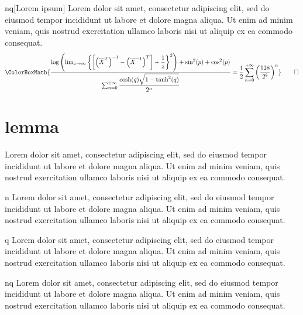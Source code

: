 \begin{proposition}{nq}[Lorem ipsum]
	Lorem dolor sit amet, consectetur adipiscing elit, sed do eiusmod tempor incididunt ut labore et dolore magna aliqua. Ut enim ad minim veniam, quis nostrud exercitation ullamco laboris nisi ut aliquip ex ea commodo consequat.
	\begin{equation*}
		\ColorBoxMath{\dfrac{\log\left(\lim_{z\to\infty}\left\{\left[\left(\overline{X}^{T}\right)^{-1}-\left(\overline{X}^{-1}\right)^T\right]+\dfrac{1}{z}\right\}^2\right)+\sin^2(p)+\cos^2(p)}{\sum_{n=0}^{+\infty}\dfrac{\cosh(q)\sqrt{1-\tanh^2(q)}}{2^n}}=\dfrac{1}{2}\sum_{n=0}^{+\infty}\left(\dfrac{128}{2^8}\right)^n}\qedhere
	\end{equation*}
\end{proposition}

\newpage

\section{lemma}

\begin{lemma}{}
	Lorem dolor sit amet, consectetur adipiscing elit, sed do eiusmod tempor incididunt ut labore et dolore magna aliqua. Ut enim ad minim veniam, quis nostrud exercitation ullamco laboris nisi ut aliquip ex ea commodo consequat.
\end{lemma}

\begin{lemma}{n}
	Lorem dolor sit amet, consectetur adipiscing elit, sed do eiusmod tempor incididunt ut labore et dolore magna aliqua. Ut enim ad minim veniam, quis nostrud exercitation ullamco laboris nisi ut aliquip ex ea commodo consequat.
\end{lemma}

\begin{lemma}{q}
	Lorem dolor sit amet, consectetur adipiscing elit, sed do eiusmod tempor incididunt ut labore et dolore magna aliqua. Ut enim ad minim veniam, quis nostrud exercitation ullamco laboris nisi ut aliquip ex ea commodo consequat.
\end{lemma}

\begin{lemma}{nq}
	Lorem dolor sit amet, consectetur adipiscing elit, sed do eiusmod tempor incididunt ut labore et dolore magna aliqua. Ut enim ad minim veniam, quis nostrud exercitation ullamco laboris nisi ut aliquip ex ea commodo consequat.
\end{lemma}

